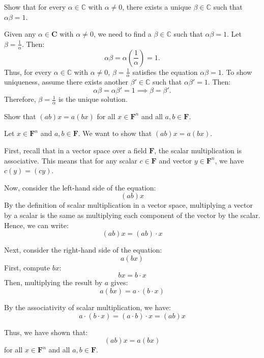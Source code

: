 \begin{exercise}
Show that for every $\alpha \in \mathbb{C}$ with $\alpha \neq 0$, there exists a unique $\beta \in \mathbb{C}$ such that $\alpha \beta = 1$.
\end{exercise}

\begin{solution}
Given any $\alpha \in \mathbf{C}$ with $\alpha \neq 0$, we need to find a $\beta \in \mathbb{C}$ such that $\alpha \beta = 1$. Let $\beta = \frac{1}{\alpha}$. Then:
\[
\alpha \beta = \alpha \left( \frac{1}{\alpha} \right) = 1.
\]
Thus, for every $\alpha \in \mathbb{C}$ with $\alpha \neq 0$, $\beta = \frac{1}{\alpha}$ satisfies the equation $\alpha \beta = 1$. To show uniqueness, assume there exists another $\beta' \in \mathbb{C}$ such that $\alpha \beta' = 1$. Then:
\[
\alpha \beta = \alpha \beta' = 1 \implies \beta = \beta'.
\]
Therefore, $\beta = \frac{1}{\alpha}$ is the unique solution.
\end{solution}

\begin{exercise}
Show that $(ab)x = a(bx)$ for all $x \in \mathbf{F}^{n}$ and all $a, b \in \mathbf{F}$.
\end{exercise}

\begin{solution}
Let $x \in \mathbf{F}^{n}$ and $a, b \in \mathbf{F}$. We want to show that $(ab)x = a(bx)$. 

First, recall that in a vector space over a field $\mathbf{F}$, the scalar multiplication is associative. This means that for any scalar $c \in \mathbf{F}$ and vector $y \in \mathbf{F}^{n}$, we have $c(y) = (cy)$. 

Now, consider the left-hand side of the equation:
\[
(ab)x
\]
By the definition of scalar multiplication in a vector space, multiplying a vector by a scalar is the same as multiplying each component of the vector by the scalar. Hence, we can write:
\[
(ab)x = (ab) \cdot x
\]

Next, consider the right-hand side of the equation:
\[
a(bx)
\]
First, compute $bx$:
\[
bx = b \cdot x
\]
Then, multiplying the result by $a$ gives:
\[
a(bx) = a \cdot (b \cdot x)
\]

By the associativity of scalar multiplication, we have:
\[
a \cdot (b \cdot x) = (a \cdot b) \cdot x = (ab)x
\]

Thus, we have shown that:
\[
(ab)x = a(bx)
\]
for all $x \in \mathbf{F}^{n}$ and all $a, b \in \mathbf{F}$.
\end{solution}

